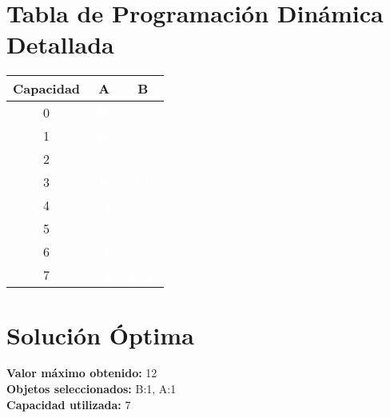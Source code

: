 \documentclass{article}
\begin{document}
\section*{Tabla de Programación Dinámica Detallada}
\begin{center}
\scriptsize
\begin{tabular}{|c|c|c|}
\hline
Capacidad & A & B \\ \hline
0 & \cellcolor{rojo}\textcolor{white}{0} & \cellcolor{rojo}\textcolor{white}{0} \\ \hline
1 & \cellcolor{rojo}\textcolor{white}{0} & \cellcolor{rojo}\textcolor{white}{0} \\ \hline
2 & \cellcolor{rojo}\textcolor{white}{0} & \cellcolor{rojo}\textcolor{white}{0} \\ \hline
3 & \cellcolor{rojo}\textcolor{white}{0} & \cellcolor{verde}\textcolor{white}{5(1)} \\ \hline
4 & \cellcolor{verde}\textcolor{white}{7(1)} & \cellcolor{rojo}\textcolor{white}{7} \\ \hline
5 & \cellcolor{verde}\textcolor{white}{7(1)} & \cellcolor{rojo}\textcolor{white}{7} \\ \hline
6 & \cellcolor{verde}\textcolor{white}{7(1)} & \cellcolor{rojo}\textcolor{white}{7} \\ \hline
7 & \cellcolor{verde}\textcolor{white}{7(1)} & \cellcolor{verde}\textcolor{white}{12(1)} \\ \hline
\end{tabular}
\end{center}
\normalsize

\section*{Solución Óptima}
\textbf{Valor máximo obtenido:} 12\\
\textbf{Objetos seleccionados:} B:1, A:1\\
\textbf{Capacidad utilizada:} 7\\
\end{document}
